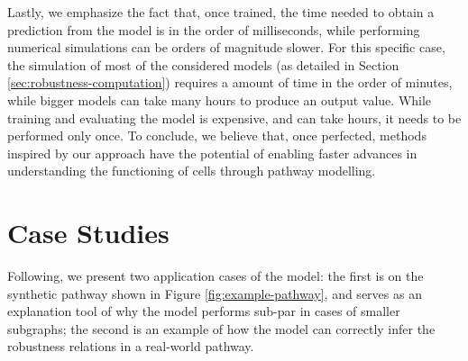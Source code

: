 Lastly, we emphasize the fact that, once trained, the time needed to obtain a prediction from the model is in the order of milliseconds, while performing numerical simulations can be orders of magnitude slower. For this specific case, the simulation of most of the considered models (as detailed in Section \ref{sec:robustness-computation}) requires a amount of time in the order of minutes, while bigger models can take many hours to produce an output value. While training and evaluating the model is expensive, and can take hours, it needs to be performed only once. To conclude, we believe that, once perfected, methods inspired by our approach have the potential of enabling faster advances in understanding the functioning of cells through pathway modelling.

\section{Case Studies}
Following, we present two application cases of the model: the first is on the synthetic pathway shown in Figure \ref{fig:example-pathway}, and serves as an explanation tool of why the model performs sub-par in cases of smaller subgraphs; the second is an example of how the model can correctly infer the robustness relations in a real-world pathway.


